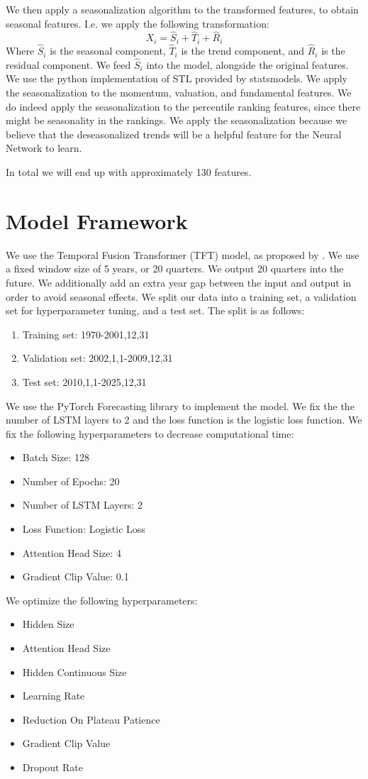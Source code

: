 \documentclass[AER]{AEA}
\begin{document}
We then apply a seasonalization algorithm to the transformed features, to obtain seasonal features. 
I.e. we apply the following transformation:
\[
X_i = \hat{S}_i + \hat{T}_i + \hat{R}_i
\]
Where $\hat{S}_i$ is the seasonal component, $\hat{T}_i$ is the trend component, and $\hat{R}_i$ is the residual component.
We feed $\hat{S}_i$ into the model, alongside the original features.
We use the python implementation of STL provided by statsmodels.
We apply the seasonalization to the momentum, valuation, and fundamental features. 
We do indeed apply the seasonalization to the percentile ranking features, since there might be seasonality in the rankings.
We apply the seasonalization because we believe that the deseasonalized trends will be a helpful feature for the Neural Network to learn.

In total we will end up with approximately 130 features.
\section{Model Framework}
We use the Temporal Fusion Transformer (TFT) model, as proposed by \cite{tft}. 
We use a fixed window size of 5 years, or 20 quarters. We output 20 quarters into the future. 
We additionally add an extra year gap between the input and output in order to avoid seasonal effects.
We split our data into a training set, a validation set for hyperparameter tuning, and a test set.
The split is as follows:
\begin{enumerate}
    \item Training set: 1970-2001,12,31
    \item Validation set: 2002,1,1-2009,12,31
    \item Test set: 2010,1,1-2025,12,31
\end{enumerate}
We use the PyTorch Forecasting library to implement the model.
We fix the the number of LSTM layers to 2 and the loss function is the logistic loss function.
We fix the following hyperparameters to decrease computational time:
\begin{itemize}
    \item Batch Size: 128
    \item Number of Epochs: 20
    \item Number of LSTM Layers: 2
    \item Loss Function: Logistic Loss
    \item Attention Head Size: 4
    \item Gradient Clip Value: 0.1
\end{itemize}
We optimize the following hyperparameters:
\begin{itemize}
    \item Hidden Size
    \item Attention Head Size
    \item Hidden Continuous Size
    \item Learning Rate
    \item Reduction On Plateau Patience
    \item Gradient Clip Value
    \item Dropout Rate
\end{itemize}
\end{document}
